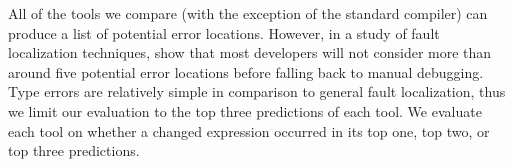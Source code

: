 

All of the tools we compare (with the exception of the standard \ocaml
compiler) can produce a list of potential error locations.
%
However, in a study of fault localization techniques,
\citet{Kochhar2016-oc} show that most developers will not consider more
than around five potential error locations before falling back to manual
debugging.
%
Type errors are relatively simple in comparison to general fault
localization, thus we limit our evaluation to the top three predictions
of each tool.
%
We evaluate each tool on whether a changed expression occurred in its
top one, top two, or top three predictions.





